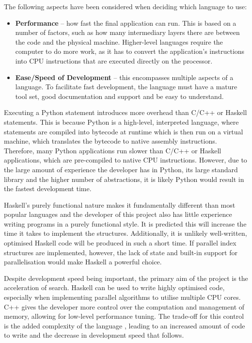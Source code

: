 The following aspects have been considered when deciding which language to use:
\begin{itemize}
	\item \textbf{Performance} -- how fast the final application can run. This is based on a number of factors, such as how many intermediary layers there are between the code and the physical machine. Higher-level languages require the computer to do more work, as it has to convert the application's instructions into CPU instructions that are executed directly on the processor.
	\item \textbf{Ease/Speed of Development} -- this encompasses multiple aspects of a language. To facilitate fast development, the language must have a mature tool set, good documentation and support and be easy to understand.
\end{itemize}
 
Executing a Python statement introduces more overhead than C/C++ or Haskell statements. This is because Python is a high-level, interpreted language, where statements are compiled into bytecode at runtime which is then run on a virtual machine, which translates the bytecode to native assembly instructions. Therefore, many Python applications run slower than C/C++ or Haskell applications, which are pre-compiled to native CPU instructions. However, due to the large amount of experience the developer has in Python, its large standard library and the higher number of abstractions, it is likely Python would result in the fastest development time. 

Haskell's purely functional nature makes it fundamentally different than most popular languages and the developer of this project also has little experience writing programs in a purely functional style. It is predicted this will increase the time it takes to implement the structures. Additionally, it is unlikely well-written, optimised Haskell code will be produced in such a short time. If parallel index structures are implemented, however, the lack of state and built-in support for parallelisation \cite{parallel-haskell} would make Haskell a powerful choice.

Despite development speed being important, the primary aim of the project is the acceleration of search. Haskell can be used to write highly optimised code, especially when implementing parallel algorithms to utilise multiple CPU cores. C++ gives the developer more control over the computation and management of memory, allowing for low-level performance tuning. The trade-off for this control is the added complexity of the language \cite{cpp-hard}, leading to an increased amount of code to write and the decrease in development speed that follows.

